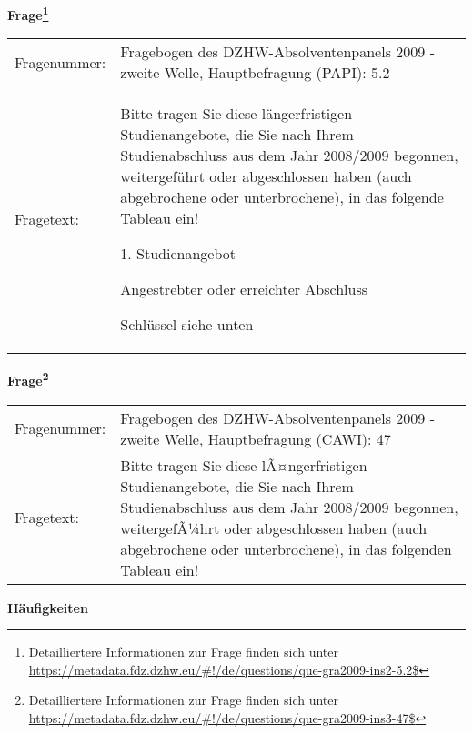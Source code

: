 				\vspace*{0.5cm}
                \noindent\textbf{Frage\footnote{Detailliertere Informationen zur Frage finden sich unter
		              \url{https://metadata.fdz.dzhw.eu/\#!/de/questions/que-gra2009-ins2-5.2$}}}\\
				\begin{tabularx}{\hsize}{@{}lX}
					Fragenummer: &
					  Fragebogen des DZHW-Absolventenpanels 2009 - zweite Welle, Hauptbefragung (PAPI):
					  5.2
 \\
					Fragetext: & Bitte tragen Sie diese längerfristigen Studienangebote, die Sie nach Ihrem Studienabschluss aus dem Jahr 2008/2009 begonnen, weitergeführt oder abgeschlossen haben (auch abgebrochene oder unterbrochene), in das folgende Tableau ein!\par  1. Studienangebot\par  Angestrebter oder erreichter Abschluss\par  Schlüssel siehe unten \\
				\end{tabularx}
				\vspace*{0.5cm}
                \noindent\textbf{Frage\footnote{Detailliertere Informationen zur Frage finden sich unter
		              \url{https://metadata.fdz.dzhw.eu/\#!/de/questions/que-gra2009-ins3-47$}}}\\
				\begin{tabularx}{\hsize}{@{}lX}
					Fragenummer: &
					  Fragebogen des DZHW-Absolventenpanels 2009 - zweite Welle, Hauptbefragung (CAWI):
					  47
 \\
					Fragetext: & Bitte tragen Sie diese lÃ¤ngerfristigen Studienangebote, die Sie nach Ihrem Studienabschluss aus dem Jahr 2008/2009 begonnen, weitergefÃ¼hrt oder abgeschlossen haben (auch abgebrochene oder unterbrochene), in das folgenden Tableau ein! \\
				\end{tabularx}





        		\vspace*{0.5cm}
                \noindent\textbf{Häufigkeiten}

